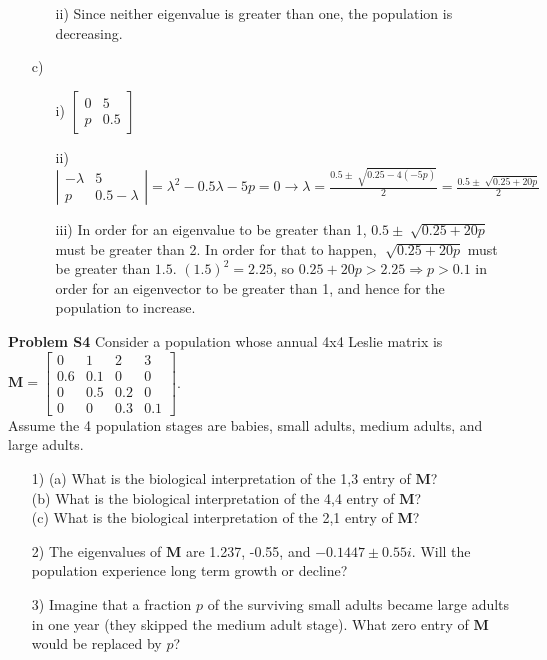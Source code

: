 \documentclass[12pt]{article}
\begin{document}
\begin{itemize}
\begin{itemize}
	\item[ii)] Since neither eigenvalue is greater than one, the population is decreasing.
	\end{itemize}
\item[c)]
	\begin{itemize}
	\item[i)] $\begin{bmatrix}
			   	0 & 5 \\ p & 0.5
			  	\end{bmatrix}$
	\item[ii)] $\left|\begin{matrix}
				-\lambda & 5 \\ p & 0.5-\lambda
				\end{matrix}\right|=\lambda^2-0.5\lambda-5p=0 \rightarrow
                \lambda = \frac{0.5\pm\sqrt[]{0.25-4(-5p)}}{2}=\frac{0.5\pm\sqrt[]{0.25+20p}}{2}$
    \item[iii)] In order for an eigenvalue to be greater than 1, $0.5\pm\sqrt[]{0.25+20p}$ must be
    			greater than 2. In order for that to happen, $\sqrt[]{0.25+20p}$ must be greater than $1.5$.
                $(1.5)^2=2.25$, so $0.25+20p > 2.25 \Rightarrow p > 0.1$ in order for an eigenvector to be greater 
                than 1, and hence for the population to increase.
	\end{itemize}
\end{itemize}

\noindent \textbf{Problem S4} \noindent Consider a population whose annual 4x4 
Leslie matrix is $\mathbf{M} = \left[\begin{array}{cccc} 0 & 1 & 2 & 3\\  0.6 & 
0.1 & 0 & 0\\ 0 & 0.5 & 0.2 & 0\\ 0 & 0 & 0.3 & 0.1 \end{array}\right]$.\\  
Assume the 4 population stages are babies, small adults, medium adults, and 
large adults. 
\begin{itemize}
\item[1)] (a) What is the biological interpretation of the 1,3 entry of 
$\mathbf{M}$? \\
(b) What is the biological interpretation of the 4,4 entry of $\mathbf{M}$?\\
(c) What is the biological interpretation of the 2,1 entry of $\mathbf{M}$?
\item[2)] The eigenvalues of $\mathbf{M}$ are 1.237, -0.55, and $-0.1447 \pm 
0.55 i$.  Will the population experience long term growth or decline?
\item[3)] Imagine that a fraction $p$ of the surviving small adults became large
adults in one year (they skipped the medium adult stage).  What zero entry of 
$\mathbf{M}$ would be replaced by $p$?
\end{itemize}
\end{document}
